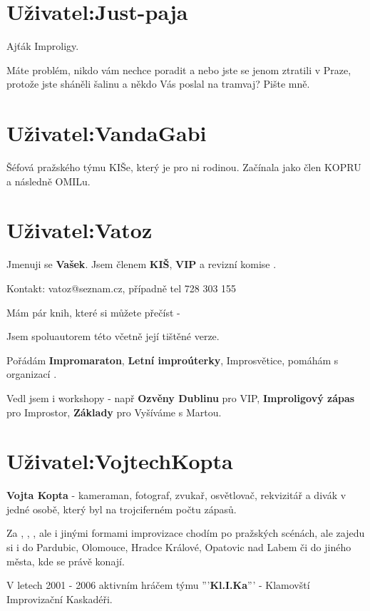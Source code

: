 \documentclass[main.tex]{subfiles}
\begin{document}
\needspace{5cm} \section{Uživatel:Just-paja} \label{uživatel:just-paja} Ajťák Improligy. 
 
Máte problém, nikdo vám nechce poradit a nebo jste se jenom ztratili v Praze, protože jste sháněli šalinu a někdo Vás poslal na tramvaj? Pište mně. 
\needspace{5cm} \section{Uživatel:VandaGabi} \label{uživatel:vandagabi} Šéfová pražského týmu KIŠe, který je pro ni rodinou. Začínala jako člen KOPRU a následně OMILu. 
\needspace{5cm} \section{Uživatel:Vatoz} \label{uživatel:vatoz} Jmenuji se \textbf{Vašek}{}. 
Jsem členem \textbf{KIŠ}{}, \textbf{VIP}{} a revizní komise . 
 
Kontakt:   vatoz@seznam.cz, případně tel 728 303 155 
 
Mám pár knih, které si můžete přečíst -  
 
Jsem spoluautorem této  včetně její tištěné verze. 
 
Pořádám \textbf{Impromaraton}, \textbf{Letní improúterky}, Improsvětice, pomáhám s organizací . 
 
Vedl jsem i workshopy  - např  \textbf{Ozvěny Dublinu}{} pro VIP, \textbf{Improligový zápas}{} pro  Improstor, \textbf{Základy}{} pro Vyšíváme s Martou. 
\needspace{5cm} \section{Uživatel:VojtechKopta} \label{uživatel:vojtechkopta} \textbf{Vojta Kopta}{} - kameraman, fotograf, zvukař, osvětlovač, rekvizitář a divák v jedné osobě, který byl na trojciferném počtu zápasů.  
 
Za , , , ale i jinými formami improvizace chodím po pražských scénách, ale zajedu si i do Pardubic, Olomouce, Hradce Králové, Opatovic nad Labem či do jiného města, kde se právě konají. 
 
V letech 2001 - 2006 aktivním hráčem týmu '''\textbf{Kl.I.Ka}''' - Klamovští Improvizační Kaskadéři. 
\end{document}
